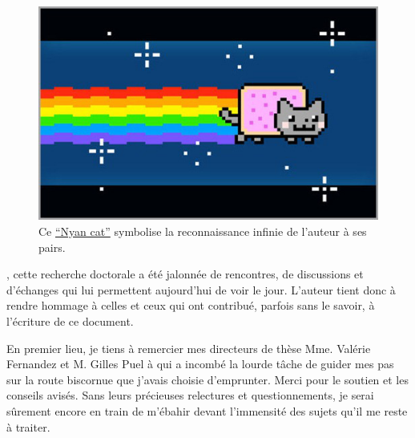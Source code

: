 


    \begin{figure}[th!]
    
       \hfill\begin{minipage}{8cm}\centering
        \includegraphics[scale=0.6]{media/nyan_cat_thumb.jpg}
        \caption*{Ce \href{https://www.youtube.com/watch?v=QH2-TGUlwu4}{``Nyan cat''} symbolise la reconnaissance infinie de l'auteur à ses pairs.}
        \end{minipage}
    \end{figure}



, cette recherche doctorale a été jalonnée de rencontres, de discussions et d'échanges qui lui permettent aujourd'hui de voir le jour. L'auteur tient donc à rendre hommage à celles et ceux qui ont contribué, parfois sans le savoir, à l'écriture de ce document.

En premier lieu, je tiens à remercier mes directeurs de thèse Mme. Valérie {\sc Fernandez} et M. Gilles {\sc Puel} à qui a incombé la lourde tâche de guider mes pas sur la route biscornue que j'avais choisie d'emprunter. Merci pour le soutien et les conseils avisés. Sans leurs précieuses relectures et questionnements, je serai sûrement encore en train de m'ébahir devant l'immensité des sujets qu'il me reste à traiter.

